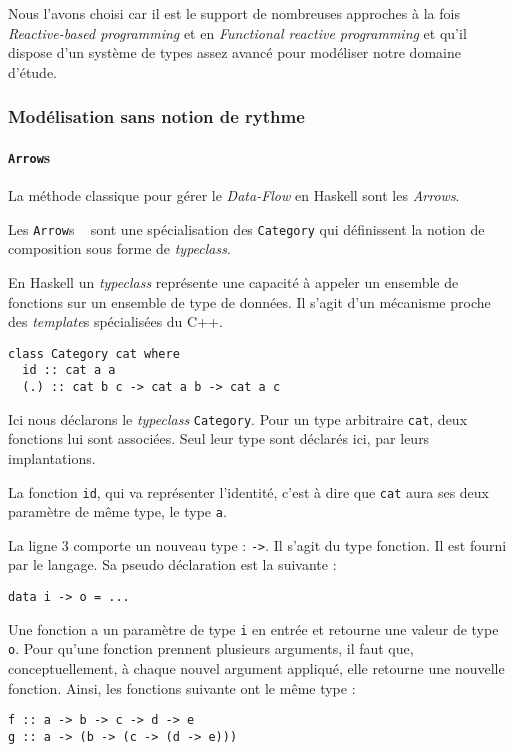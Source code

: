 \documentclass{llncs}
\newcommand{\DF}{\emph{Data-Flow} }
\newcommand{\RP}{\emph{Reactive-based programming} }
\newcommand{\FRP}{\emph{Functional reactive programming} }
\newcommand{\Arrs}{\lstinline{Arrow}s }
\begin{document}
Nous l'avons choisi car il est le support de nombreuses approches à la fois \RP
et en \FRP et qu'il dispose d'un système de types assez avancé pour modéliser
notre domaine d'étude.

\subsubsection{Modélisation sans notion de rythme}
\paragraph{\Arrs}
La méthode classique pour gérer le \DF en Haskell sont les \emph{Arrows}.

Les \Arrs~\cite{Hughes00} sont une spécialisation des \lstinline{Category}
qui définissent la notion de composition sous forme de \emph{typeclass}.

En Haskell un \emph{typeclass} représente une capacité à appeler un ensemble
de fonctions sur un ensemble de type de données.
Il s'agit d'un mécanisme proche des \emph{template}s spécialisées du C++.

\begin{lstlisting}
class Category cat where
  id :: cat a a
  (.) :: cat b c -> cat a b -> cat a c
\end{lstlisting}

Ici nous déclarons le \emph{typeclass} \lstinline{Category}.
Pour un type arbitraire \lstinline{cat}, deux fonctions lui sont associées.
Seul leur type sont déclarés ici, par leurs implantations.

La fonction \lstinline{id}, qui va représenter l'identité, c'est à dire
que  \lstinline{cat} aura ses deux paramètre de même type, le type \lstinline{a}.

La ligne 3 comporte un nouveau type : \lstinline{->}.
Il s'agit du type fonction.
Il est fourni par le langage.
Sa pseudo déclaration est la suivante :
\begin{lstlisting}
data i -> o = ...
\end{lstlisting}
Une fonction a un paramètre de type \lstinline{i} en entrée et retourne une
valeur de type \lstinline{o}.
Pour qu'une fonction prennent plusieurs arguments, il faut que, conceptuellement,
à chaque nouvel argument appliqué, elle retourne une nouvelle fonction.
Ainsi, les fonctions suivante ont le même type :
\begin{lstlisting}
f :: a -> b -> c -> d -> e
g :: a -> (b -> (c -> (d -> e)))
\end{lstlisting}
\end{document}
